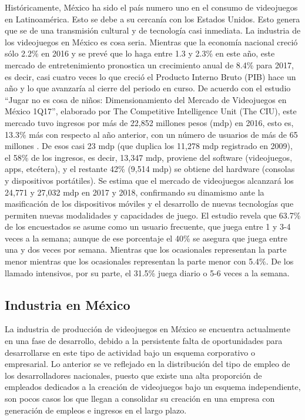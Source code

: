 Históricamente, México ha sido el país numero uno en el consumo de videojuegos en Latinoamérica. Esto se debe a su cercanía con los Estados Unidos. Esto genera que se de una transmisión cultural y de tecnología casi inmediata. La industria de los videojuegos en México es cosa seria. Mientras que la economía nacional creció sólo 2.2\% en 2016 y se prevé que lo haga entre 1.3 y 2.3\% en este año, este mercado de entretenimiento pronostica un crecimiento anual de 8.4\% para 2017, es decir, casi cuatro veces lo que creció el Producto Interno Bruto (PIB) hace un año y lo que avanzaría al cierre del periodo en curso. De acuerdo con el estudio “Jugar no es cosa de niños: Dimensionamiento del Mercado de Videojuegos en México 1Q17”, elaborado por The Competitive Intelligence Unit (The CIU), este mercado tuvo ingresos por más de 22,852 millones pesos (mdp) en 2016, esto es, 13.3\% más con respecto al año anterior, con un número de usuarios de más de 65 millones \cite{vid03}. De esos casi 23 mdp (que duplica los 11,278 mdp registrado en 2009), el 58\% de los ingresos, es decir, 13,347 mdp, proviene del software (videojuegos, apps, etcétera), y el restante 42\% (9,514 mdp) se obtiene del hardware (consolas y dispositivos portátiles). Se estima que el mercado de videojuegos alcanzará los 24,771 y 27,032 mdp en 2017 y 2018, confirmando su dinamismo ante la masificación de los dispositivos móviles y el desarrollo de nuevas tecnologías que permiten nuevas modalidades y capacidades de juego. El estudio revela que 63.7\% de los encuestados se asume como un usuario frecuente, que juega entre 1 y 3-4 veces a la semana; aunque de ese porcentaje el 40\% se asegura que juega entre una y dos veces por semana. Mientras que los ocasionales representan la parte menor mientras que los ocasionales representan la parte menor con 5.4\%. De los llamado intensivos, por su parte, el 31.5\% juega diario o 5-6 veces a la semana.

\subsection{Industria en México}
La industria de producción de videojuegos en México se encuentra actualmente en una fase de desarrollo, debido a la persistente falta de oportunidades para desarrollarse en este tipo de actividad bajo un esquema corporativo o empresarial. Lo anterior se ve reflejado en la distribución del tipo de empleo de los desarrolladores nacionales, puesto que existe una alta proporción de empleados dedicados a la creación de videojuegos bajo un esquema independiente, son pocos casos los que llegan a consolidar su creación en una empresa con generación de empleos e ingresos en el largo plazo.

